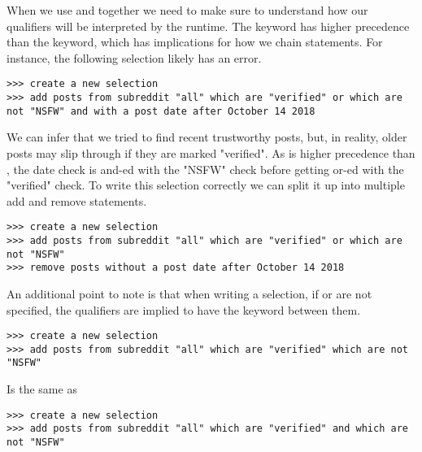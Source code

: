 When we use  and  together we need to make sure to understand how our qualifiers will be interpreted by the runtime. The  keyword has higher precedence than the  keyword, which has implications for how we chain statements. For instance, the following selection likely has an error.
\newline\begin{minipage}{\linewidth}\begin{lstlisting}
>>> create a new selection
>>> add posts from subreddit "all" which are "verified" or which are not "NSFW" and with a post date after October 14 2018
\end{lstlisting}\end{minipage}
We can infer that we tried to find recent trustworthy posts, but, in reality, older posts may slip through if they are marked "verified". As  is higher precedence than , the date check is and-ed with the "NSFW" check before getting or-ed with the "verified" check. To write this selection correctly we can split it up into multiple add and remove statements.
\newline\begin{minipage}{\linewidth}\begin{lstlisting}
>>> create a new selection
>>> add posts from subreddit "all" which are "verified" or which are not "NSFW"
>>> remove posts without a post date after October 14 2018
\end{lstlisting}\end{minipage}
An additional point to note is that when writing a selection, if  or  are not specified, the qualifiers are implied to have the  keyword between them.
\newline\begin{minipage}{\linewidth}\begin{lstlisting}
>>> create a new selection
>>> add posts from subreddit "all" which are "verified" which are not "NSFW"
\end{lstlisting}\end{minipage}
Is the same as
\newline\begin{minipage}{\linewidth}\begin{lstlisting}
>>> create a new selection
>>> add posts from subreddit "all" which are "verified" and which are not "NSFW"
\end{lstlisting}\end{minipage}

